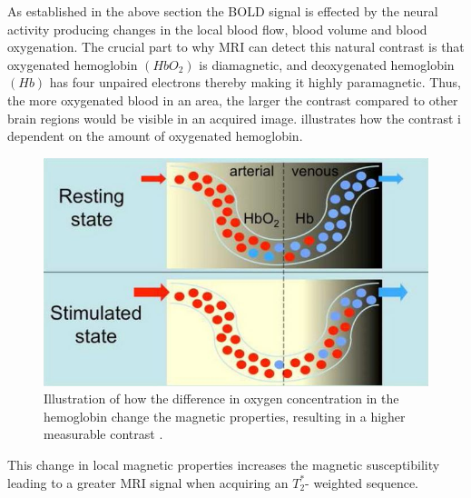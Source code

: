 As established in the above section the BOLD signal is effected by the neural activity producing changes in the local blood flow, blood volume and blood oxygenation. The crucial part to why MRI can detect this natural contrast is that oxygenated hemoglobin $(HbO_2)$ is diamagnetic, and deoxygenated hemoglobin $(Hb)$ has four unpaired electrons thereby making it highly paramagnetic. Thus, the more oxygenated blood in an area, the larger the contrast compared to other brain regions would be visible in an acquired image. \cite{Glover2011,Poldrack2011,Khanna2015}  illustrates how the contrast i dependent on the amount of oxygenated hemoglobin. \cite{Glover2011}

\begin{figure}[H]                 
	\includegraphics[width=.52\textwidth]{figures/aBackground/bold_response}  
	\caption{Illustration of how the difference in oxygen concentration in the hemoglobin change the magnetic properties, resulting in a higher measurable contrast \cite{Glover2011}.}
	\label{fig:back:bold} 
\end{figure}

This change in local magnetic properties increases the magnetic susceptibility leading to a greater MRI signal when acquiring an $T_2^*$- weighted sequence.  
